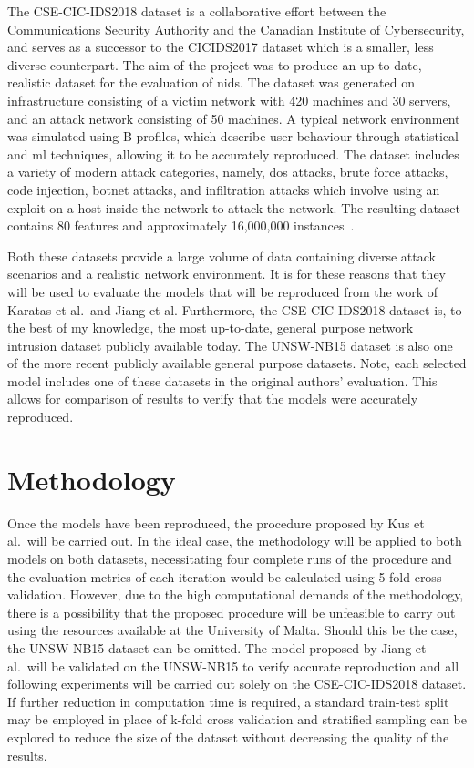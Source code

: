 The CSE-CIC-IDS2018 dataset is a collaborative effort between the
Communications Security Authority and the Canadian Institute of Cybersecurity,
and serves as a successor to the CICIDS2017 dataset which is a smaller, less
diverse counterpart. The aim of the project was to produce an up to date,
realistic dataset for the evaluation of \gls{nids}. The dataset was generated
on infrastructure consisting of a victim network with 420 machines and 30
servers, and an attack network consisting of 50 machines. A typical network
environment was simulated using B-profiles, which describe user behaviour
through statistical and \gls{ml} techniques, allowing it to be accurately
reproduced. The dataset includes a variety of modern attack categories, namely,
\gls{dos} attacks, brute force attacks, code injection, botnet attacks, and
infiltration attacks which involve using an exploit on a host inside the
network to attack the network. The resulting dataset contains 80 features and
approximately 16,000,000 instances~\cite{cic2018, cic2018data}.

Both these datasets provide a large volume of data containing diverse attack
scenarios and a realistic network environment. It is for these reasons that
they will be used to evaluate the models that will be reproduced from the work
of Karatas et al.\ and Jiang et al. Furthermore, the CSE-CIC-IDS2018 dataset
is, to the best of my knowledge, the most up-to-date, general purpose network
intrusion dataset publicly available today. The UNSW-NB15 dataset is also one
of the more recent publicly available general purpose datasets. Note, each
selected model includes one of these datasets in the original authors'
evaluation. This allows for comparison of results to verify that the models
were accurately reproduced.

\section{Methodology}%
\label{sec:methodology}

Once the models have been reproduced, the procedure proposed by Kus et al.\
will be carried out. In the ideal case, the methodology will be applied to both
models on both datasets, necessitating four complete runs of the procedure and
the evaluation metrics of each iteration would be calculated using 5-fold cross
validation. However, due to the high computational demands of the methodology,
there is a possibility that the proposed procedure will be unfeasible to carry
out using the resources available at the University of Malta. Should this be
the case, the UNSW-NB15 dataset can be omitted. The model proposed by Jiang et
al.\ will be validated on the UNSW-NB15 to verify accurate reproduction and all
following experiments will be carried out solely on the CSE-CIC-IDS2018
dataset. If further reduction in computation time is required, a standard
train-test split may be employed in place of k-fold cross validation and
stratified sampling can be explored to reduce the size of the dataset without
decreasing the quality of the results.

